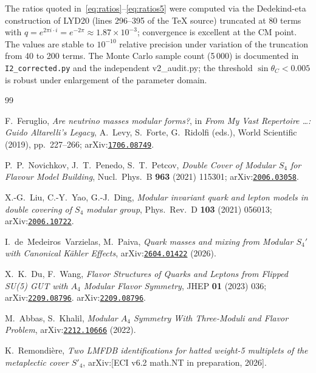 \documentclass[a4paper,11pt]{article}
\newcommand{\sinTC}{\sin\theta_C}
\newcommand{\arXiv}[1]{\href{https://arxiv.org/abs/#1}{\texttt{#1}}}
\begin{document}
The ratios quoted in~\eqref{eq:ratios}--\eqref{eq:ratios5} were
computed via the Dedekind-eta construction of LYD20 (lines 296--395 of
the TeX source) truncated at 80 terms with $q=e^{2\pi i\cdot i}=e^{-2\pi}
\approx 1.87\times10^{-3}$; convergence is excellent at the CM point.
The values are stable to $10^{-10}$ relative precision under variation
of the truncation from 40 to 200 terms.  The Monte Carlo sample count
(5\,000) is documented in \texttt{I2\_corrected.py} and the independent
v2\_audit.py; the threshold $\sinTC<0.005$ is robust under enlargement
of the parameter domain.

\begin{thebibliography}{99}

F.~Feruglio,
\emph{Are neutrino masses modular forms?},
in \emph{From My Vast Repertoire \ldots: Guido Altarelli's Legacy},
A.~Levy, S.~Forte, G.~Ridolfi (eds.), World Scientific (2019),
pp.~227--266; arXiv:\arXiv{1706.08749}.

P.~P.~Novichkov, J.~T.~Penedo, S.~T.~Petcov,
\emph{Double Cover of Modular $S_4$ for Flavour Model Building},
Nucl.~Phys.~B \textbf{963} (2021) 115301; arXiv:\arXiv{2006.03058}.

X.-G.~Liu, C.-Y.~Yao, G.-J.~Ding,
\emph{Modular invariant quark and lepton models in double covering of
$S_4$ modular group},
Phys.~Rev.~D \textbf{103} (2021) 056013; arXiv:\arXiv{2006.10722}.

I.~de~Medeiros~Varzielas, M.~Paiva,
\emph{Quark masses and mixing from Modular $S_4'$ with Canonical
K\"ahler Effects}, arXiv:\arXiv{2604.01422} (2026).

X.~K.~Du, F.~Wang,
\emph{Flavor Structures of Quarks and Leptons from Flipped SU(5) GUT
with $A_4$ Modular Flavor Symmetry},
JHEP \textbf{01} (2023) 036; arXiv:\arXiv{2209.08796}.
arXiv:\arXiv{2209.08796}.

M.~Abbas, S.~Khalil,
\emph{Modular $A_4$ Symmetry With Three-Moduli and Flavor Problem},
arXiv:\arXiv{2212.10666} (2022).

K.~Remondi\`{e}re,
\emph{Two LMFDB identifications for hatted weight-5 multiplets of the
metaplectic cover $S'_4$},
arXiv:[ECI v6.2 math.NT in preparation, 2026].

\end{thebibliography}
\end{document}
